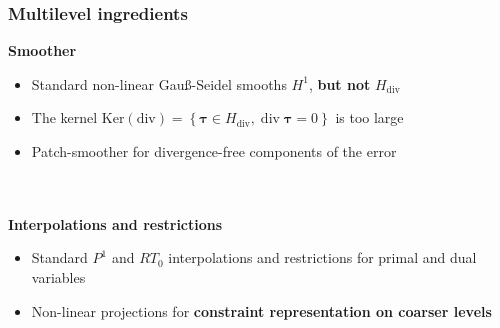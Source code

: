 \documentclass[8pt, oneside]{beamer}   	%
\newcommand{\tdiv}{\operatorname{div}}
\newcommand{\btau}{\boldsymbol{\tau}}
\newcommand{\colo}{\color{orange}}
\newcommand{\colk}{\color{black}}
\newcommand{\titlecolor}[1]{\frametitle{\textcolor{dkgrey}{ \textbf{#1}}}}
\begin{document}
\begin{frame}
\titlecolor{Multilevel ingredients}
\textbf{Smoother}
\begin{itemize}
\item Standard non-linear Gau{\ss}-Seidel smooths $H^1$, \textbf{but not} $H_{\text{div}}$ 
\item The kernel $\text{Ker}(\text{div})=  \left\lbrace \btau \in H_{\text{div}}, \tdiv \btau =0   \right\rbrace $ is too large
\item Patch-smoother \colk for divergence-free components of the error
\end{itemize}
${}$\\${}$\\
\textbf{Interpolations and restrictions}
\begin{itemize}
\item  Standard $P^1$ and $RT_0$ interpolations and restrictions for primal and dual variables
\item Non-linear projections for \colo \textbf{constraint representation on coarser levels} \colk
\end{itemize}
\end{frame}






\end{document}
